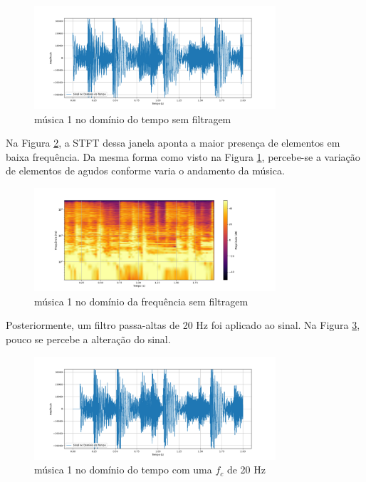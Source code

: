 \begin{figure}[h]
	\centering
    \includegraphics[width=0.8\textwidth]{figuras/fig40.png}
	\caption{música 1 no domínio do tempo sem filtragem}
	\label{fig40}
\end{figure}

Na Figura \ref{fig41}, a STFT dessa janela aponta a maior presença de elementos em baixa frequência. Da mesma forma como visto na Figura \ref{fig40}, percebe-se a variação de elementos de agudos conforme varia o andamento da música. 

\begin{figure}[h]
	\centering
    \includegraphics[width=0.8\textwidth]{figuras/fig41.png}
	\caption{música 1 no domínio da frequência sem filtragem}
	\label{fig41}
\end{figure}

Posteriormente, um filtro passa-altas de 20 Hz foi aplicado ao sinal. Na Figura \ref{fig24}, pouco se percebe a alteração do sinal.

\begin{figure}[h]
	\centering
    \includegraphics[width=0.8\textwidth]{figuras/fig24.png}
	\caption{música 1 no domínio do tempo com uma $f_c$ de 20 Hz}
	\label{fig24}
\end{figure}

